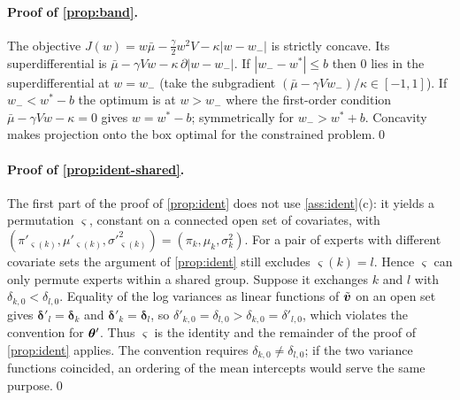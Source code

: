 \paragraph{Proof of \cref{prop:band}.}
The objective $J(w)=w\bar\mu-\tfrac\gamma2w^2V-\kappa|w-w_-|$ is strictly concave. Its
superdifferential is $\bar\mu-\gamma Vw-\kappa\,\partial|w-w_-|$. If $|w_--w^\ast|\le b$ then $0$
lies in the superdifferential at $w=w_-$ (take the subgradient $(\bar\mu-\gamma Vw_-)/\kappa\in[-1,1]$).
If $w_-<w^\ast-b$ the optimum is at $w>w_-$ where the first-order condition
$\bar\mu-\gamma Vw-\kappa=0$ gives $w=w^\ast-b$; symmetrically for $w_->w^\ast+b$. Concavity makes
projection onto the box optimal for the constrained problem.\qed

\paragraph{Proof of \cref{prop:ident-shared}.}
The first part of the proof of \cref{prop:ident} does not use \cref{ass:ident}(c): it yields a
permutation $\varsigma$, constant on a connected open set of covariates, with
$(\pi'_{\varsigma(k)},\mu'_{\varsigma(k)},\sigma'^2_{\varsigma(k)})=(\pi_k,\mu_k,\sigma_k^2)$. For a pair of
experts with different covariate sets the argument of \cref{prop:ident} still excludes
$\varsigma(k)=l$. Hence $\varsigma$ can only permute experts within a shared group. Suppose it
exchanges $k$ and $l$ with $\delta_{k,0}<\delta_{l,0}$. Equality of the log variances as linear
functions of $\tilde{\bm{v}}$ on an open set gives $\bm\delta'_l=\bm\delta_k$ and $\bm\delta'_k=\bm\delta_l$,
so $\delta'_{k,0}=\delta_{l,0}>\delta_{k,0}=\delta'_{l,0}$, which violates the convention for
$\bm{\theta}'$. Thus $\varsigma$ is the identity and the remainder of the proof of \cref{prop:ident}
applies. The convention requires $\delta_{k,0}\neq\delta_{l,0}$; if the two variance functions
coincided, an ordering of the mean intercepts would serve the same purpose.\qed

